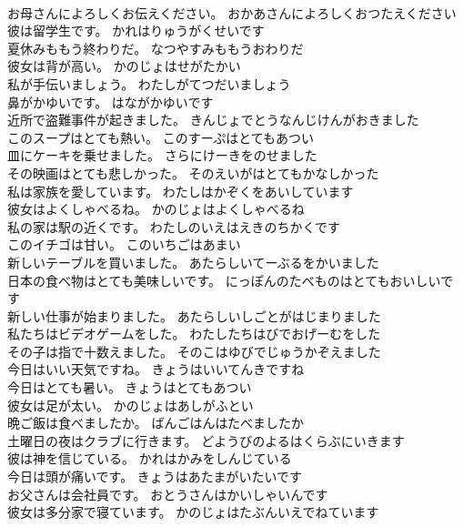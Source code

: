 \documentclass[8pt]{extreport}
\begin{document}
\begin{CJK}{UTF8}{min}
\\	お母さんによろしくお伝えください。	おかあさんによろしくおつたえください 
\\	彼は留学生です。	かれはりゅうがくせいです 
\\	夏休みももう終わりだ。	なつやすみももうおわりだ 
\\	彼女は背が高い。	かのじょはせがたかい 
\\	私が手伝いましょう。	わたしがてつだいましょう 
\\	鼻がかゆいです。	はながかゆいです 
\\	近所で盗難事件が起きました。	きんじょでとうなんじけんがおきました 
\\	このスープはとても熱い。	このすーぷはとてもあつい 
\\	皿にケーキを乗せました。	さらにけーきをのせました 
\\	その映画はとても悲しかった。	そのえいがはとてもかなしかった 
\\	私は家族を愛しています。	わたしはかぞくをあいしています 
\\	彼女はよくしゃべるね。	かのじょはよくしゃべるね 
\\	私の家は駅の近くです。	わたしのいえはえきのちかくです 
\\	このイチゴは甘い。	このいちごはあまい 
\\	新しいテーブルを買いました。	あたらしいてーぶるをかいました 
\\	日本の食べ物はとても美味しいです。	にっぽんのたべものはとてもおいしいです 
\\	新しい仕事が始まりました。	あたらしいしごとがはじまりました 
\\	私たちはビデオゲームをした。	わたしたちはびでおげーむをした 
\\	その子は指で十数えました。	そのこはゆびでじゅうかぞえました 
\\	今日はいい天気ですね。	きょうはいいてんきですね 
\\	今日はとても暑い。	きょうはとてもあつい 
\\	彼女は足が太い。	かのじょはあしがふとい 
\\	晩ご飯は食べましたか。	ばんごはんはたべましたか 
\\	土曜日の夜はクラブに行きます。	どようびのよるはくらぶにいきます 
\\	彼は神を信じている。	かれはかみをしんじている 
\\	今日は頭が痛いです。	きょうはあたまがいたいです 
\\	お父さんは会社員です。	おとうさんはかいしゃいんです 
\\	彼女は多分家で寝ています。	かのじょはたぶんいえでねています 

\end{CJK}
\end{document}
